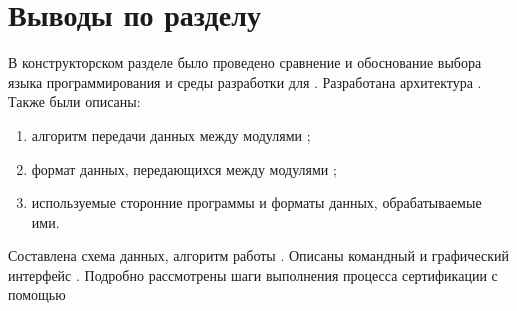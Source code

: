 \section{Выводы по разделу}\label{sec:ch1/sec5}
В конструкторском разделе было проведено сравнение и обоснование выбора языка программирования
и среды разработки для {\ProgModule}.
Разработана архитектура {\ProgModule}.
Также были описаны:
\begin{enumerate}[label={\arabic*)}]
    \item алгоритм передачи данных между модулями {\ProgModule};
    \item формат данных, передающихся между модулями {\ProgModule};
    \item используемые сторонние программы и форматы данных, обрабатываемые ими.
\end{enumerate}
Составлена схема данных, алгоритм работы {\ProgModule}. Описаны командный и графический интерфейс {\ProgModule}.
Подробно рассмотрены шаги выполнения процесса сертификации с помощью {\ProgModule}
